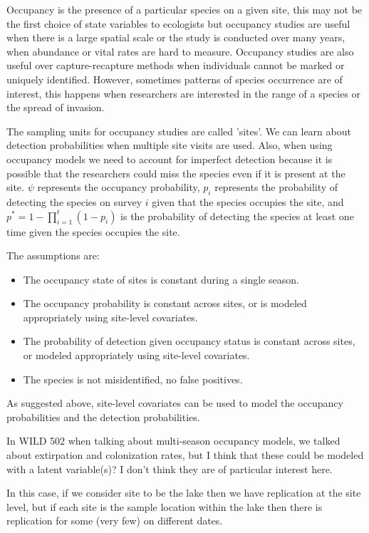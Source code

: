 \documentclass[12pt]{article}\usepackage[]{graphicx}\usepackage[]{color}
\begin{document}
Occupancy is the presence of a particular species on a given site, this may not be the first choice of state variables to ecologists but occupancy studies are useful when there is a large spatial scale or the study is conducted over many years, when abundance or vital rates are hard to measure. Occupancy studies are also useful over capture-recapture methods when individuals cannot be marked or uniquely identified. However, sometimes patterns of species occurrence are of interest, this happens when researchers are interested in the range of a species or the spread of invasion. 

The sampling units for occupancy studies are called 'sites'. We can learn about detection probabilities when multiple site visits are used. Also, when using occupancy models we need to account for imperfect detection because it is possible that the researchers could miss the species even if it is present at the site. $\psi$ represents the occupancy probability, $p_i$ represents the probability of detecting the species on survey $i$ given that the species occupies the site, and $p^* = 1- \prod_{i = 1}^{t} (1-p_i)$ is the probability of detecting the species at least one time given the species occupies the site. 

The assumptions are: 
\begin{itemize}
\item The occupancy state of sites is constant during a single season. 
\item The occupancy probability is constant across sites, or is modeled appropriately using site-level covariates. 
\item The probability of detection given occupancy status is constant across sites, or modeled appropriately using site-level covariates. 
\item The species is not misidentified, no false positives. 
\end{itemize}

As suggested above, site-level covariates can be used to model the occupancy probabilities and the detection probabilities. 

In WILD 502 when talking about multi-season occupancy models, we talked about extirpation and colonization rates, but I think that these could be modeled with a latent variable(s)? I don't think they are of particular interest here. 

In this case, if we consider site to be the lake then we have replication at the site level, but if each site is the sample location within the lake then there is replication for some (very few) on different dates. 
\end{document}
